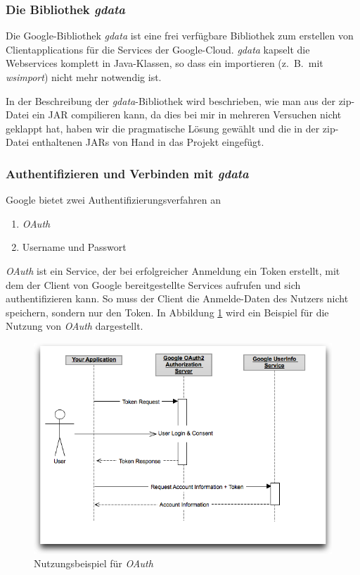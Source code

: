 \subsubsection{Die Bibliothek \emph{gdata}}
Die Google-Bibliothek \emph{gdata} ist eine frei verf\"ugbare Bibliothek zum erstellen von
 Clientapplications für die Services der Google-Cloud.
\emph{gdata} kapselt die Webservices komplett in Java-Klassen, so dass ein importieren
 (z.\ B.\ mit \emph{wsimport}) nicht mehr notwendig ist.

In der Beschreibung der \emph{gdata}-Bibliothek wird beschrieben, wie man aus der zip-Datei
 ein JAR compilieren kann, da dies bei mir in mehreren Versuchen nicht geklappt hat,
 haben wir die pragmatische Lösung gewählt und die in der zip-Datei enthaltenen JARs von Hand
 in das Projekt eingefügt.

\subsubsection{Authentifizieren und Verbinden mit \emph{gdata}}
Google bietet zwei Authentifizierungsverfahren an
\begin{enumerate}
	\item\emph{OAuth}
	\item Username und Passwort
\end{enumerate}
\emph{OAuth} ist ein Service, der bei erfolgreicher Anmeldung ein Token erstellt, mit dem
 der Client von Google bereitgestellte Services aufrufen und sich authentifizieren kann.
So muss der Client die Anmelde-Daten des Nutzers nicht speichern, sondern nur den Token.
In Abbildung \ref{fig:google_oauth} wird ein Beispiel f\"ur die Nutzung von \emph{OAuth} dargestellt.
\begin{figure}[h!]
\includegraphics[width=\textwidth]{Bilder/googleOauth.png}
\caption{Nutzungsbeispiel f\"ur \emph{OAuth}\cite{GO01}}
\label{fig:google_oauth}
\end{figure}

